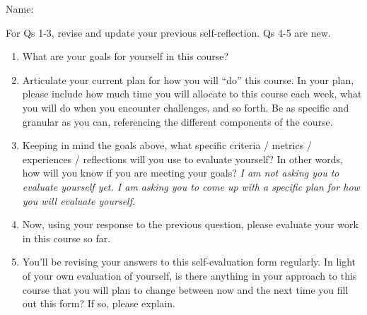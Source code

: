 \documentclass[12pt,letterpaper,noanswers]{exam}
\begin{document}
 \pdfpageheight 11in 
  \pdfpagewidth 8.5in
\noindent  Name:
\vspace{0.2cm}

\noindent For Qs 1-3, revise and update your previous self-reflection.  Qs 4-5 are new.

\begin{enumerate}
    \item What are your goals for yourself in this course?
    \vspace{1.7in}
    
\item Articulate your current plan for how you will “do” this course. In your plan, please include how much time you will allocate to this course each week, what you will do when you encounter challenges, and so forth. Be as specific and granular as you can, referencing the different components of the course.

\vspace{3in}
\eject 
\item Keeping in mind the goals above, what specific criteria / metrics / experiences / reflections will you use to evaluate yourself? In other words, how will you know if you are meeting your goals? \emph{I am not asking you to evaluate yourself yet. I am asking you to come up with a specific plan for how you will evaluate yourself.}
\vspace{3in}

\item Now, using your response to the previous question, please evaluate your work in this course so far.
\vspace{2.5in}
\item You'll be revising your answers to this self-evaluation form regularly. In light of your own evaluation of yourself, is there anything in your approach to this course that you will plan to change between now and the next time you fill out this form? If so, please explain.
\end{enumerate}
\end{document}
